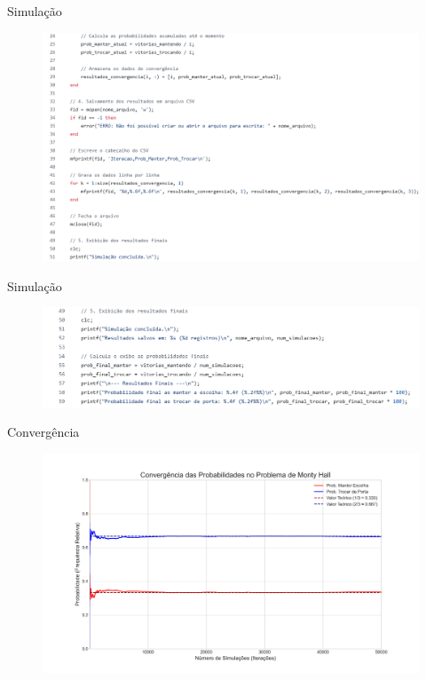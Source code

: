 \begin{frame}[fragile]{Simulação}
 \begin{figure}
    \centering
    \includegraphics[width=0.9\linewidth]{figures/parte ok 2.png}
 \end{figure}
\end{frame}

\begin{frame}[fragile]{Simulação}
 \begin{figure}
    \centering
    \includegraphics[width=0.9\linewidth]{figures/Captura de tela 2025-07-18 160019.png}
 \end{figure}
\end{frame}

\begin{frame}[fragile]{Convergência}
 \begin{figure}
    \centering
    \includegraphics[width=0.9\linewidth]{figures/convergencia_monty_hall.png}
 \end{figure}
\end{frame}

